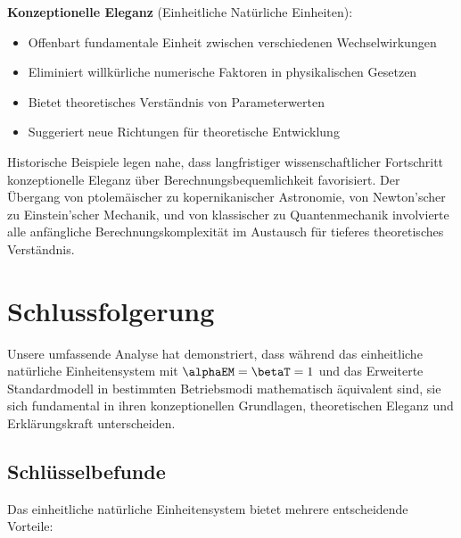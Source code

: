 	\textbf{Konzeptionelle Eleganz} (Einheitliche Natürliche Einheiten):
	\begin{itemize}
		\item Offenbart fundamentale Einheit zwischen verschiedenen Wechselwirkungen
		\item Eliminiert willkürliche numerische Faktoren in physikalischen Gesetzen
		\item Bietet theoretisches Verständnis von Parameterwerten
		\item Suggeriert neue Richtungen für theoretische Entwicklung
	\end{itemize}
	
	Historische Beispiele legen nahe, dass langfristiger wissenschaftlicher Fortschritt konzeptionelle Eleganz über Berechnungsbequemlichkeit favorisiert. Der Übergang von ptolemäischer zu kopernikanischer Astronomie, von Newton'scher zu Einstein'scher Mechanik, und von klassischer zu Quantenmechanik involvierte alle anfängliche Berechnungskomplexität im Austausch für tieferes theoretisches Verständnis.
	
	\section{Schlussfolgerung}
	\label{sec:conclusion}
	
	Unsere umfassende Analyse hat demonstriert, dass während das einheitliche natürliche Einheitensystem mit $\alphaEM = \betaT = 1$ und das Erweiterte Standardmodell in bestimmten Betriebsmodi mathematisch äquivalent sind, sie sich fundamental in ihren konzeptionellen Grundlagen, theoretischen Eleganz und Erklärungskraft unterscheiden.
	
	\subsection{Schlüsselbefunde}
	\label{subsec:key_findings}
	
	Das einheitliche natürliche Einheitensystem bietet mehrere entscheidende Vorteile:
	

